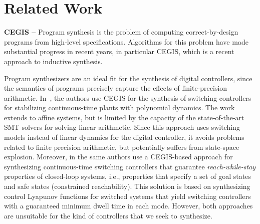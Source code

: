 \documentclass[twocolumn]{autart}    %
\renewcommand{\note}[1]{\textcolor{red}{[#1]}}
\begin{document}
\section{Related Work}
\label{sec:relw}

\textbf{CEGIS --} Program synthesis is the problem of computing
correct-by-design programs from high-level specifications. Algorithms
for this problem have made substantial progress in recent years, in
particular CEGIS, which is a recent approach to inductive synthesis.


Program synthesizers are an ideal fit for the synthesis of digital controllers, since
the semantics of programs precisely capture the effects of finite-precision arithmetic.  
In~\cite{DBLP:conf/cdc/RavanbakhshS15}, the authors use CEGIS 
for the synthesis of switching controllers for stabilizing continuous-time
plants with polynomial dynamics.  The work extends to affine systems, but is
limited by the capacity of the state-of-the-art SMT solvers for solving
linear arithmetic.  Since this approach uses switching models instead of
linear dynamics for the digital controller, it avoids problems related to
finite precision arithmetic, but potentially suffers from state-space
explosion.  Moreover, in \cite{DBLP:conf/emsoft/RavanbakhshS16} the same
authors use a CEGIS-based approach for synthesizing continuous-time
switching controllers that guarantee \emph{reach-while-stay} properties of
closed-loop systems, i.e., properties that specify a set of goal states and
safe states (constrained reachability).  This solution is based on
synthesizing control Lyapunov functions for switched systems that yield
switching controllers with a guaranteed minimum dwell time in each mode. 
However, both approaches are unsuitable for the kind of controllers that we seek to
synthesize.
\end{document}
